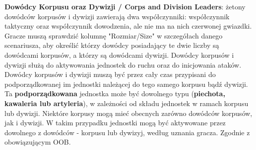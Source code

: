 \textbf{Dowódcy Korpusu oraz Dywizji / Corps and Division Leaders}: żetony dowódców korpusów i dywizji zawierają dwa współczynniki: współczynnik taktyczny oraz współczynnik dowodzenia, ale nie ma na nich czerwonej gwiazdki. Gracze muszą sprawdzić kolumnę "Rozmiar/Size" w szczegółach danego scenariusza, aby określić którzy dowódcy posiadający te dwie liczby są dowódcami korpusów, a którzy są dowódcami dywizji. Dowódcy korpusów i dywizji służą do aktywowania jednostek do ruchu oraz do inicjowania ataków. Dowódcy korpusów i dywizji muszą być przez cały czas przypisani do podporządkowanej im jednostki należącej do tego samego korpusu bądź dywizji. Ta \textbf{podporządkowana} jednostka może być dowolnego typu (\textbf{piechota, kawaleria lub artyleria}), w zależności od składu jednostek w ramach korpusu lub dywizji. Niektóre korpusy mogą mieć obecnych zarówno dowódców korpusów, jak i dywizji. W takim przypadku jednostki mogą być aktywowane przez dowolnego z dowódców - korpusu lub dywizyj, według uznania gracza. Zgodnie z obowiązującym OOB.\par
